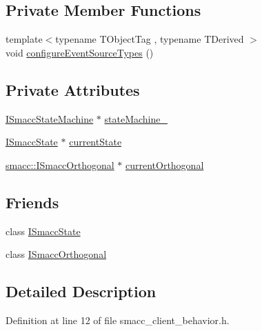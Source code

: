 \subsection*{Private Member Functions}
\begin{DoxyCompactItemize}
\item 
{\footnotesize template$<$typename T\+Object\+Tag , typename T\+Derived $>$ }\\void \hyperlink{classsmacc_1_1SmaccClientBehavior_a532a84b947599545a9955949c3b76648}{configure\+Event\+Source\+Types} ()
\end{DoxyCompactItemize}
\subsection*{Private Attributes}
\begin{DoxyCompactItemize}
\item 
\hyperlink{classsmacc_1_1ISmaccStateMachine}{I\+Smacc\+State\+Machine} $\ast$ \hyperlink{classsmacc_1_1SmaccClientBehavior_a7950b5684d6de0a8e8959c0936ce9a19}{state\+Machine\+\_\+}
\item 
\hyperlink{classsmacc_1_1ISmaccState}{I\+Smacc\+State} $\ast$ \hyperlink{classsmacc_1_1SmaccClientBehavior_af76fc9b877542ed5caf033f820c107d0}{current\+State}
\item 
\hyperlink{classsmacc_1_1ISmaccOrthogonal}{smacc\+::\+I\+Smacc\+Orthogonal} $\ast$ \hyperlink{classsmacc_1_1SmaccClientBehavior_a37e6a2fe61c3a72ed2f3e4180f552089}{current\+Orthogonal}
\end{DoxyCompactItemize}
\subsection*{Friends}
\begin{DoxyCompactItemize}
\item 
class \hyperlink{classsmacc_1_1SmaccClientBehavior_ab907e4cdbf326246355f56640780162e}{I\+Smacc\+State}
\item 
class \hyperlink{classsmacc_1_1SmaccClientBehavior_a7205cc84a71fea903124d54d01e99a68}{I\+Smacc\+Orthogonal}
\end{DoxyCompactItemize}


\subsection{Detailed Description}


Definition at line 12 of file smacc\+\_\+client\+\_\+behavior.\+h.



